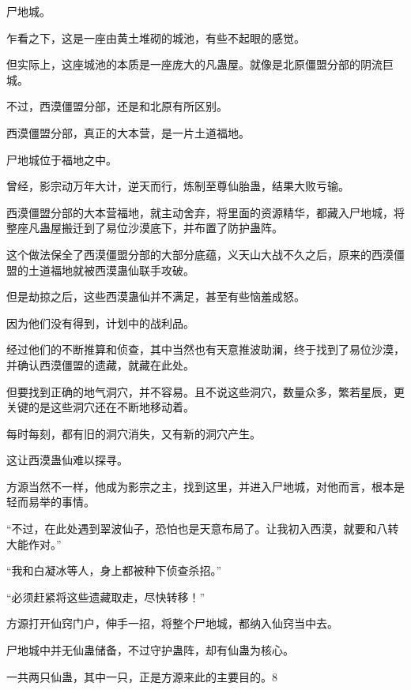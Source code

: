 \begin{this_body}
尸地城。

乍看之下，这是一座由黄土堆砌的城池，有些不起眼的感觉。

但实际上，这座城池的本质是一座庞大的凡蛊屋。就像是北原僵盟分部的阴流巨城。

不过，西漠僵盟分部，还是和北原有所区别。

西漠僵盟分部，真正的大本营，是一片土道福地。

尸地城位于福地之中。

曾经，影宗动万年大计，逆天而行，炼制至尊仙胎蛊，结果大败亏输。

西漠僵盟分部的大本营福地，就主动舍弃，将里面的资源精华，都藏入尸地城，将整座凡蛊屋搬迁到了易位沙漠底下，并布置了防护蛊阵。

这个做法保全了西漠僵盟分部的大部分底蕴，义天山大战不久之后，原来的西漠僵盟的土道福地就被西漠蛊仙联手攻破。

但是劫掠之后，这些西漠蛊仙并不满足，甚至有些恼羞成怒。

因为他们没有得到，计划中的战利品。

经过他们的不断推算和侦查，其中当然也有天意推波助澜，终于找到了易位沙漠，并确认西漠僵盟的遗藏，就藏在此处。

但要找到正确的地气洞穴，并不容易。且不说这些洞穴，数量众多，繁若星辰，更关键的是这些洞穴还在不断地移动着。

每时每刻，都有旧的洞穴消失，又有新的洞穴产生。

这让西漠蛊仙难以探寻。

方源当然不一样，他成为影宗之主，找到这里，并进入尸地城，对他而言，根本是轻而易举的事情。

“不过，在此处遇到翠波仙子，恐怕也是天意布局了。让我初入西漠，就要和八转大能作对。”

“我和白凝冰等人，身上都被种下侦查杀招。”

“必须赶紧将这些遗藏取走，尽快转移！”

方源打开仙窍门户，伸手一招，将整个尸地城，都纳入仙窍当中去。

尸地城中并无仙蛊储备，不过守护蛊阵，却有仙蛊为核心。

一共两只仙蛊，其中一只，正是方源来此的主要目的。8

\end{this_body}

